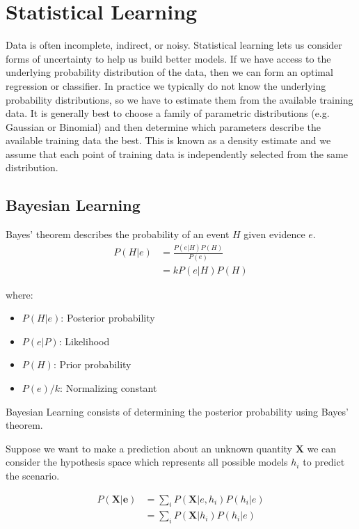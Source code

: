 \documentclass[12pt]{article}
\begin{document}
\section{Statistical Learning}
    Data is often incomplete, indirect, or noisy. Statistical learning lets us consider forms of uncertainty to help us
    build better models. If we have access to the underlying probability distribution of the data, then we can form an
    optimal regression or classifier. In practice we typically do not know the underlying probability distributions, so
    we have to estimate them from the available training data. It is generally best to choose a family of parametric
    distributions (e.g. Gaussian or Binomial) and then determine which parameters describe the available training data
    the best. This is known as a density estimate and we assume that each point of training data is independently
    selected from the same distribution.

    \subsection{Bayesian Learning} \label{sec:BayesianLearning}
    Bayes' theorem \label{fact:Bayes} describes the probability of an event $H$ given evidence $e$.
    \begin{align}
        P(H|e) &= \frac{P(e|H)P(H)}{P(e)} \\
        &= kP(e|H)P(H)
    \end{align}

    where:
    \begin{itemize}
        \item $P(H|e)$: Posterior probability \label{fact:Posterior}
        \item $P(e|P)$: Likelihood \label{fact:Likelihood}
        \item $P(H)$: Prior probability \label{fact:Prior}
        \item $P(e)/k$: Normalizing constant
    \end{itemize}

    Bayesian Learning consists of determining the posterior probability using Bayes' theorem.
    
    Suppose we want to make a prediction about an unknown quantity $\boldsymbol{X}$ we can consider the hypothesis space
    which represents all possible models $h_i$ to predict the scenario.

    \begin{align}
        P(\boldsymbol{X}|\boldsymbol{e}) &= \sum_i P(\boldsymbol{X}|e, h_i)P(h_i|e) \\
        &= \sum_i P(\boldsymbol{X}|h_i)P(h_i|e)
    \end{align}
\end{document}
